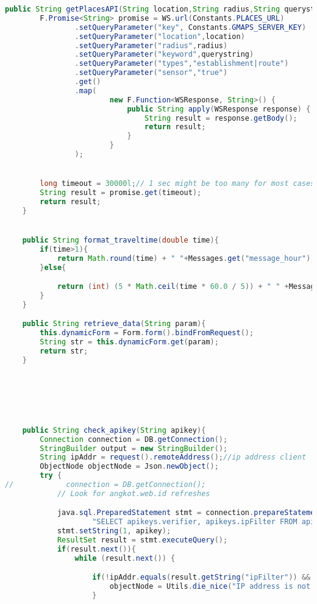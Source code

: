 \begin{lstlisting}[language=Java,basicstyle=\tiny,caption=Application.java]
    public String getPlacesAPI(String location,String radius,String querystring) {
        F.Promise<String> promise = WS.url(Constants.PLACES_URL)
                .setQueryParameter("key", Constants.GMAPS_SERVER_KEY)
                .setQueryParameter("location",location)
                .setQueryParameter("radius",radius)
                .setQueryParameter("keyword",querystring)
                .setQueryParameter("types","establishment|route")
                .setQueryParameter("sensor","true")
                .get()
                .map(
                        new F.Function<WSResponse, String>() {
                            public String apply(WSResponse response) {
                                String result = response.getBody();
                                return result;
                            }
                        }
                );


        long timeout = 30000l;// 1 sec might be too many for most cases!
        String result = promise.get(timeout);
        return result;
    }


    public String format_traveltime(double time){
        if(time>1){
            return Math.round(time) + " "+Messages.get("message_hour");
        }else{

            return (int) (5 * Math.ceil(time * 60.0 / 5)) + " " +Messages.get("message_min");
        }
    }

    public String retrieve_data(String param){
        this.dynamicForm = Form.form().bindFromRequest();
        String str = this.dynamicForm.get(param);
        return str;
    }






    public String check_apikey(String apikey){
        Connection connection = DB.getConnection();
        StringBuilder output = new StringBuilder();
        String ipAddr = request().remoteAddress();//ip address client
        ObjectNode objectNode = Json.newObject();
        try {
//            connection = DB.getConnection();
            // Look for angkot.web.id refreshes

            java.sql.PreparedStatement stmt = connection.prepareStatement(
                    "SELECT apikeys.verifier, apikeys.ipFilter FROM apikeys WHERE apikeys.verifier = ?");
            stmt.setString(1, apikey);
            ResultSet result = stmt.executeQuery();
            if(result.next()){
                while (result.next()) {

                    if(!ipAddr.equals(result.getString("ipFilter")) && !result.getString("ipFilter").isEmpty()){
                        objectNode = Utils.die_nice("IP address is not accepted for this API key.");
                    }


\end{lstlisting}
